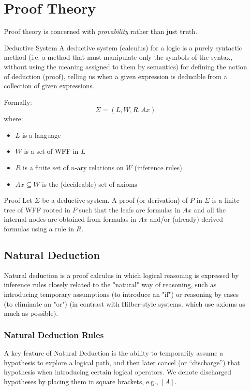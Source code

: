 \documentclass[a4paper, 11pt]{report}
\begin{document}
\makecustomcover

\tableofcontents
\clearpage

\chapter{Proof Theory}
Proof theory is concerned with \textit{provability} rather than just truth.

\begin{defframe}{Deductive System}{}
    A deductive system (calculus) for a logic is a purely syntactic method (i.e. a method that must manipulate only the symbols of the syntax, without using the meaning assigned to them by semantics) for defining the notion of deduction (proof), telling us when a given expression is deducible from a collection of given expressions.

    Formally:
    $$\Sigma = (L, W, R, Ax)$$
    where:
    \begin{itemize}
        \item $L$ is a language
        \item $W$ is a set of WFF in $L$
        \item $R$ is a finite set of $n$-ary relations on $W$ (inference rules)
        \item $Ax \subseteq W$ is the (decideable) set of axioms
    \end{itemize}
\end{defframe}

\begin{defframe}{Proof}{}
    Let $\Sigma$ be a deductive system. A proof (or derivation) of $P$ in $\Sigma$ is a finite tree of WFF rooted in $P$ such that the leafs are formulas in $Ax$ and all the internal nodes are obtained from formulas in $Ax$ and/or (already) derived formulas using a rule in $R$.
\end{defframe}

\section{Natural Deduction}
Natural deduction is a proof calculus in which logical reasoning is expressed by inference rules closely related to the "natural" way of reasoning, such as introducing temporary assumptions (to introduce an "if") or reasoning by cases (to eliminate an "or") (in contrast with Hilber-style systems, which use axioms as much as possible).


\subsection{Natural Deduction Rules}
A key feature of Natural Deduction is the ability to temporarily assume a hypothesis to explore a logical path, and then later cancel (or ``discharge'') that hypothesis when introducing certain logical operators. We denote discharged hypotheses by placing them in square brackets, e.g., $[A]$.
\end{document}

